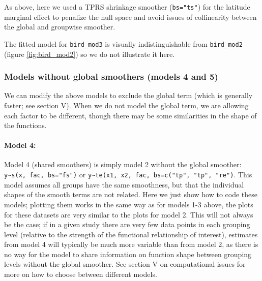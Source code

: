 \documentclass[12pt]{article}
\let\oldparagraph\paragraph
\renewcommand{\paragraph}[1]{\oldparagraph{#1}\mbox{}}
\begin{document}
As above, here we used a TPRS shrinkage smoother (\texttt{bs="ts"}) for
the latitude marginal effect to penalize the null space and avoid issues
of collinearity between the global and groupwise smoother.

The fitted model for \texttt{bird\_mod3} is visually indistinguishable
from \texttt{bird\_mod2} (figure \ref{fig:bird_mod2}) so we do not
illustrate it here.

\subsubsection{Models without global smoothers (models 4 and
5)}\label{models-without-global-smoothers-models-4-and-5}

We can modify the above models to exclude the global term (which is
generally faster; see section V). When we do not model the global term,
we are allowing each factor to be different, though there may be some
similarities in the shape of the functions.

\paragraph{Model 4:}\label{model-4}

Model 4 (shared smoothers) is simply model 2 without the global
smoother: \texttt{y\textasciitilde{}s(x,\ fac,\ bs="fs")} or
\texttt{y\textasciitilde{}te(x1,\ x2,\ fac,\ bs=c("tp",\ "tp",\ "re")}.
This model assumes all groups have the same smoothness, but that the
individual shapes of the smooth terms are not related. Here we just show
how to code these models; plotting them works in the same way as for
models 1-3 above, the plots for these datasets are very similar to the
plots for model 2. This will not always be the case; if in a given study
there are very few data points in each grouping level (relative to the
strength of the functional relationship of interest), estimates from
model 4 will typically be much more variable than from model 2, as there
is no way for the model to share information on function shape between
grouping levels without the global smoother. See section V on
computational issues for more on how to choose between different models.
\end{document}
